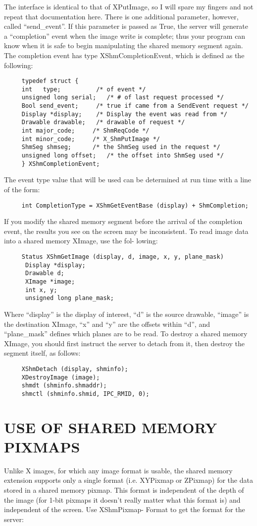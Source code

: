 \documentclass{article}
\begin{document}
The interface is identical to that of XPutImage, so I will
spare my fingers and not repeat that documentation here.
There is one additional parameter, however, called
``send\_event''.	 If this parameter is passed as True, the
server will generate a ``completion'' event when the image
write is complete; thus your program can know when it is
safe to begin manipulating the shared memory segment again.
The completion event has type XShmCompletionEvent, which is
defined as the following:
\begin{verbatim}
     typedef struct {
	 int   type;		  /* of event */
	 unsigned long serial;	 /* # of last request processed */
	 Bool send_event;	  /* true if came from a SendEvent request */
	 Display *display;	  /* Display the event was read from */
	 Drawable drawable;	  /* drawable of request */
	 int major_code;     /* ShmReqCode */
	 int minor_code;     /* X_ShmPutImage */
	 ShmSeg shmseg;	     /* the ShmSeg used in the request */
	 unsigned long offset;	 /* the offset into ShmSeg used */
     } XShmCompletionEvent;
\end{verbatim}
The event type value that will be used can be determined at
run time with a line of the form:
\begin{verbatim}
     int CompletionType = XShmGetEventBase (display) + ShmCompletion;
\end{verbatim}
If you modify the shared memory segment before the arrival
of the completion event, the results you see on the screen
may be inconsistent.
To read image data into a shared memory XImage, use the fol-
lowing:
\begin{verbatim}
     Status XShmGetImage (display, d, image, x, y, plane_mask)
	  Display *display;
	  Drawable d;
	  XImage *image;
	  int x, y;
	  unsigned long plane_mask;
\end{verbatim}
Where ``display'' is the display of interest, ``d'' is the
source drawable, ``image'' is the destination XImage, ``x''
and ``y'' are the offsets within ``d'', and ``plane\_mask''
defines which planes are to be read.
To destroy a shared memory XImage, you should first instruct
the server to detach from it, then destroy the segment
itself, as follows:

\begin{verbatim}
     XShmDetach (display, shminfo);
     XDestroyImage (image);
     shmdt (shminfo.shmaddr);
     shmctl (shminfo.shmid, IPC_RMID, 0);
\end{verbatim}

\section{USE OF SHARED MEMORY PIXMAPS}
Unlike X images, for which any image format is usable, the
shared memory extension supports only a single format (i.e.
XYPixmap or ZPixmap) for the data stored in a shared memory
pixmap.	 This format is independent of the depth of the
image (for 1-bit pixmaps it doesn't really matter what this
format is) and independent of the screen.  Use XShmPixmap-
Format to get the format for the server:
\end{document}

